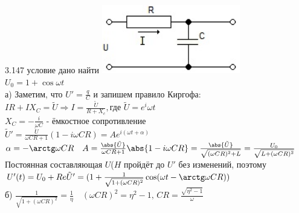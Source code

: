 \testCom
{%
	3.147
}
{%
	условие
}
{%
	дано
}
{%
	найти
}
{%
	\includegraphics[height=30mm]{3_147.jpg}\\
	$U_0 = 1 + \cos \omega t$\\
	а) Заметим, что $U' = \frac{q}{C}$ и запишем правило Киргофа:\\
	$ I R + I X_C = \tilde U \Rightarrow I = \frac{\tilde U}{R + X_c}, $где $\tilde U = e^i\omega t$\\
	$X_C = - \frac{i}{\omega C}$ - ёмкостное сопротивление\\
	$\tilde U' = \frac{\tilde U}{\omega C R + 1}(1 - i \omega C R) = A e^{i (\omega t + \alpha)}$\\
	$\alpha = - \arctg \omega C R \quad A = \frac{\abs{\tilde U}}{\omega C R + 1} \abs{1 - i \omega C R} = \frac{\abs{\tilde U}}{\sqrt{ (\omega C R)^2 + L}} = \frac{U_0}{\sqrt{L  + (\omega C R)^2 }}$\\
	Постоянная составляющая $U$($H$ пройдёт до $U'$ без изменений, поэтому\\
	$U'(t) = U_0 + Re \tilde U' = (1 + \frac{1}{\sqrt{1 + (\omega C R)^2}} \cos (\omega t - \arctg \omega C R))$\\
	б) $\frac{1}{\sqrt{1 + (\omega C R)^2}} = \frac{1}{\eta} \quad (\omega C R)^2 = \eta^2 - 1, \, CR = \frac{\sqrt{\eta^2 - 1}}{\omega}$\\
}

